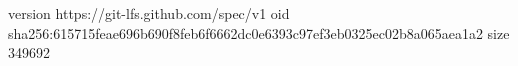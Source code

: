 version https://git-lfs.github.com/spec/v1
oid sha256:615715feae696b690f8feb6f6662dc0e6393c97ef3eb0325ec02b8a065aea1a2
size 349692
